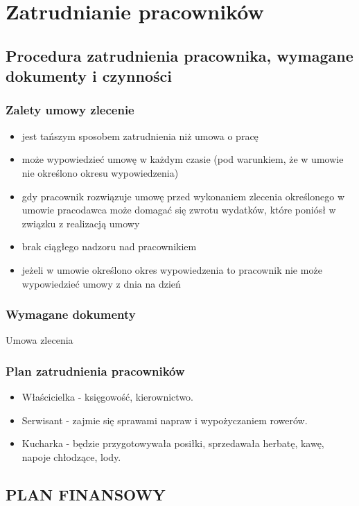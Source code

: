 \documentclass{sprawozdanie-agh}
\begin{document}
	\section{Zatrudnianie pracowników}

		\subsection{Procedura zatrudnienia pracownika, wymagane dokumenty i czynności}

		\subsubsection{Zalety umowy zlecenie}
		\begin{itemize}
			\item jest tańszym sposobem zatrudnienia niż umowa o pracę
			\item może wypowiedzieć umowę w każdym czasie (pod warunkiem, że w umowie nie określono okresu wypowiedzenia)
			\item gdy pracownik rozwiązuje umowę przed wykonaniem zlecenia określonego w umowie pracodawca może domagać się zwrotu wydatków, które poniósł w związku z realizacją umowy
			\item brak ciągłego nadzoru nad pracownikiem
			\item jeżeli w umowie określono okres wypowiedzenia to pracownik nie może wypowiedzieć umowy z dnia na dzień
		\end{itemize}
		
		\subsubsection{Wymagane dokumenty}
		Umowa zlecenia

		\subsubsection{Plan zatrudnienia pracowników}

		\begin{itemize}
		\item Właścicielka - księgowość, kierownictwo. 
		\item Serwisant - zajmie się sprawami napraw i wypożyczaniem rowerów.
		\item Kucharka - będzie przygotowywała posiłki, sprzedawała herbatę, kawę, napoje chłodzące, lody.
		\end{itemize}
	
		\subsection{PLAN FINANSOWY}
\end{document}
